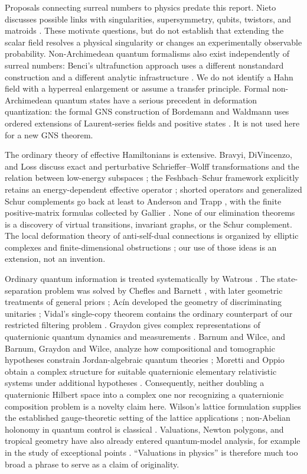 \documentclass[11pt,oneside]{article}
\numberwithin{equation}{section}
\theoremstyle{plain}
\theoremstyle{definition}
\theoremstyle{remark}
\begin{document}
Proposals connecting surreal numbers to physics predate this report. Nieto discusses possible links with singularities, supersymmetry, qubits, twistors, and matroids \cite{Nieto2016,Nieto2018}. These motivate questions, but do not establish that extending the scalar field resolves a physical singularity or changes an experimentally observable probability. Non-Archimedean quantum formalisms also exist independently of surreal numbers: Benci's ultrafunction approach uses a different nonstandard construction and a different analytic infrastructure \cite{Benci}. We do not identify a Hahn field with a hyperreal enlargement or assume a transfer principle. Formal non-Archimedean quantum states have a serious precedent in deformation quantization: the formal GNS construction of Bordemann and Waldmann uses ordered extensions of Laurent-series fields and positive states \cite{BW}. It is not used here for a new GNS theorem.

The ordinary theory of effective Hamiltonians is extensive. Bravyi, DiVincenzo, and Loss discuss exact and perturbative Schrieffer--Wolff transformations and the relation between low-energy subspaces \cite{BDL}; the Feshbach--Schur framework explicitly retains an energy-dependent effective operator \cite{DSS}; shorted operators and generalized Schur complements go back at least to Anderson and Trapp \cite{AT}, with the finite positive-matrix formulas collected by Gallier \cite{Gallier}. None of our elimination theorems is a discovery of virtual transitions, invariant graphs, or the Schur complement. The local deformation theory of anti-self-dual connections is organized by elliptic complexes and finite-dimensional obstructions \cite{AHS,Itoh}; our use of those ideas is an extension, not an invention.

Ordinary quantum information is treated systematically by Watrous \cite{Watrous}. The state-separation problem was solved by Chefles and Barnett \cite{CheflesBarnett}, with later geometric treatments of general priors \cite{Bagan}; Ac\'in developed the geometry of discriminating unitaries \cite{Acin}; Vidal's single-copy theorem contains the ordinary counterpart of our restricted filtering problem \cite{Vidal}. Graydon gives complex representations of quaternionic quantum dynamics and measurements \cite{Graydon}. Barnum and Wilce, and Barnum, Graydon and Wilce, analyze how compositional and tomographic hypotheses constrain Jordan-algebraic quantum theories \cite{BarnumWilce,BGW}; Moretti and Oppio obtain a complex structure for suitable quaternionic elementary relativistic systems under additional hypotheses \cite{MorettiOppio}. Consequently, neither doubling a quaternionic Hilbert space into a complex one nor recognizing a quaternionic composition problem is a novelty claim here. Wilson's lattice formulation supplies the established gauge-theoretic setting of the lattice applications \cite{Wilson}; non-Abelian holonomy in quantum control is classical \cite{ZanardiRasetti}. Valuations, Newton polygons, and tropical geometry have also already entered quantum-model analysis, for example in the study of exceptional points \cite{BanerjeeEtAl}. ``Valuations in physics'' is therefore much too broad a phrase to serve as a claim of originality.
\end{document}
